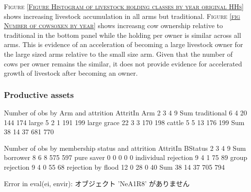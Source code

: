 \begin{palepinkleftbar}
\begin{finding}
\textsc{Figure \ref{Figure Histogram of livestock holding classes by year original HHs}} shows increasing livestock accumulation in all arms but \textsf{traditional}. 
\textsc{Figure \ref{fig Number of cowsoxen by year}} shows increasng cow ownership relative to \textsf{traditional} in the bottom panel while the holding per owner is similar across all arms. This is evidence of an acceleration of becoming a large livestock owner for the large sized arms relative to the small size arm. Given that the number of cows per owner remains the similar, it does not provide evidence for accelerated growth of livestock after becoming an owner.
\end{finding}
\end{palepinkleftbar}


\subsubsection{Productive assets}


\begin{Schunk}
\begin{Soutput}


Number of obs by Arm and attrition
             AttritIn
Arm             2   3   4   9 Sum
  traditional   6   4  20 144 174
  large         5   2   1 191 199
  large grace  22   3   3 170 198
  cattle        5   5  13 176 199
  Sum          38  14  37 681 770


Number of obs by membership status and attrition
                      AttritIn
BStatus                  2   3   4   9 Sum
  borrower               8   6   8 575 597
  pure saver             0   0   0   0   0
  individual rejection   9   4   1  75  89
  group rejection        9   4   0  55  68
  rejection by flood    12   0  28   0  40
  Sum                   38  14  37 705 794
\end{Soutput}
\begin{Soutput}
Error in eval(ei, envir):  オブジェクト 'NeA1R8' がありません 
\end{Soutput}
\end{Schunk}




